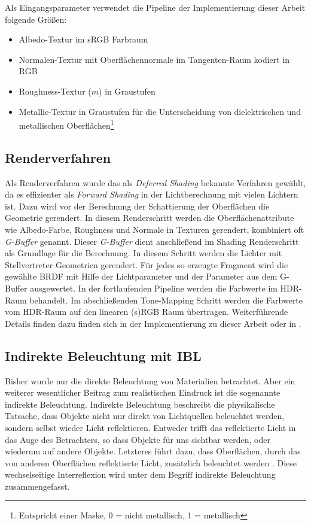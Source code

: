 Als Eingangsparameter verwendet die Pipeline der Implementierung dieser Arbeit folgende Größen:
\begin{itemize}
\item Albedo-Textur im sRGB Farbraum
\item Normalen-Textur mit Oberflächennormale im Tangenten-Raum kodiert in RGB
\item Roughness-Textur ($m$) in Graustufen
\item Metallic-Textur in Graustufen für die Unterscheidung von dielektrischen und metallischen Oberflächen\footnote{Entspricht einer Maske, 0 = nicht metallisch, 1 = metallisch}
\end{itemize}


\subsection{Renderverfahren}

Als Renderverfahren wurde das als \textit{Deferred Shading} bekannte Verfahren gewählt, da es effizienter als \textit{Forward Shading} in der Lichtberechnung mit vielen Lichtern ist. Dazu wird vor der Berechnung der Schattierung der Oberflächen die Geometrie gerendert. In diesem Renderschritt werden die Oberflächenattribute wie Albedo-Farbe, Roughness und Normale in Texturen gerendert, kombiniert oft \textit{G-Buffer} genannt. Dieser \textit{G-Buffer} dient anschließend im Shading Renderschritt als Grundlage für die Berechnung. In diesem Schritt werden die Lichter mit Stellvertreter Geometrien gerendert. Für jedes so erzeugte Fragment wird die gewählte \ac{BRDF} mit Hilfe der Lichtparameter und der Parameter aus dem G-Buffer ausgewertet. In der fortlaufenden Pipeline werden die Farbwerte im HDR-Raum behandelt. Im abschließenden Tone-Mapping Schritt werden die Farbwerte vom HDR-Raum auf den linearen (s)RGB Raum übertragen. Weiterführende Details finden dazu finden sich in der Implementierung zu dieser Arbeit oder in \cite{Shishkovtsov2005}.

\subsection[Indirekte Beleuchtung]{Indirekte Beleuchtung mit \acl{IBL}}

Bisher wurde nur die direkte Beleuchtung von Materialien betrachtet. Aber ein weiterer wesentlicher Beitrag zum realistischen Eindruck ist die sogenannte indirekte Beleuchtung. Indirekte Beleuchtung beschreibt die physikalische Tatsache, dass Objekte nicht nur direkt von Lichtquellen beleuchtet werden, sondern selbst wieder Licht reflektieren. Entweder trifft das reflektierte Licht in das Auge des Betrachters, so dass Objekte für uns sichtbar werden, oder wiederum auf andere Objekte. Letzteres führt dazu, dass Oberflächen, durch das von anderen Oberflächen reflektierte Licht, zusätzlich beleuchtet werden . Diese wechselseitige Interreflexion wird unter dem Begriff indirekte Beleuchtung zusammengefasst.

